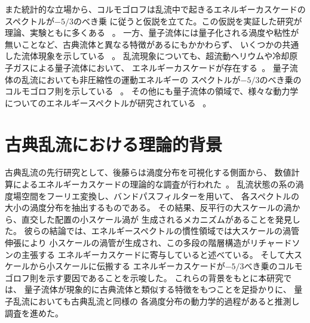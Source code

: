 \documentclass[12pt,a4paper]{jbook}
\begin{document}
		また統計的な立場から、コルモゴロフは乱流中で起きるエネルギーカスケードのスペクトルが$-5/3$のべき乗
		に従うと仮説を立てた。この仮説を実証した研究が理論、実験ともに多くある
		~\cite{Frisch1, Kolmogorov, Batchelor, Tatsumi1, Tatsumi2, Kraichnan, Frisch2, Cyril, Goto1, Goto2}。
		一方、量子流体には量子化される渦度や粘性が無いことなど、古典流体と異なる特徴があるにもかかわらず、
		いくつかの共通した流体現象を示している
        ~\cite{Sasaki1, Reeves1, Kwon0, Sasaki2, Kadokura, Takeuchi0, Bezett}。
		乱流現象についても、超流動ヘリウムや冷却原子ガスによる量子流体において、
		エネルギーカスケードが存在する~\cite{Skrbek, Navon}。
		量子流体の乱流においても非圧縮性の運動エネルギーの
		スペクトルが$-5/3$のべき乗のコルモゴロフ則を示している
		~\cite{Araki, Kobayashi1, Kobayashi2, Kobayashi3}。
		その他にも量子流体の領域で、様々な動力学についてのエネルギースペクトルが研究されている
		~\cite{
		Kerr3, Tsubota2, Kerr1, Nemirovskii, Kolmakov, Barenghi0, Walmsley, Hanninen,
        White, Barenghi2, Fujimoto0, Kobayashi4, Nore, Tabeling, Stalp, Madison, Barenghi1,
        Parker, Walmsley2, Baggaley, Reeves2, Baggaley2, Nemirovskii2, Villois
        }。


		\section{古典乱流における理論的背景}
		古典乱流の先行研究として、後藤らは渦度分布を可視化する側面から、
		数値計算によるエネルギーカスケードの理論的な調査が行われた~\cite{Goto1,Goto2}。
		乱流状態の系の渦度場空間をフーリエ変換し、バンドパスフィルターを用いて、
		各スペクトルの大小の渦度分布を抽出するものである。
		その結果、反平行の大スケールの渦から、直交した配置の小スケール渦が
		生成されるメカニズムがあることを発見した。
		彼らの結論では、エネルギースペクトルの慣性領域では大スケールの渦管伸張により
		小スケールの渦管が生成され、この多段の階層構造がリチャードソンの主張する
		エネルギーカスケードに寄与していると述べている。
		そして大スケールから小スケールに伝搬する
		エネルギーカスケードが$-5/3$べき乗のコルモゴロフ則を示す要因であることを示唆した。
		これらの背景をもとに本研究では、
        量子流体が現象的に古典流体と類似する特徴をもつことを足掛かりに、
		量子乱流においても古典乱流と同様の
		各渦度分布の動力学的過程があると推測し調査を進めた。
\end{document}
